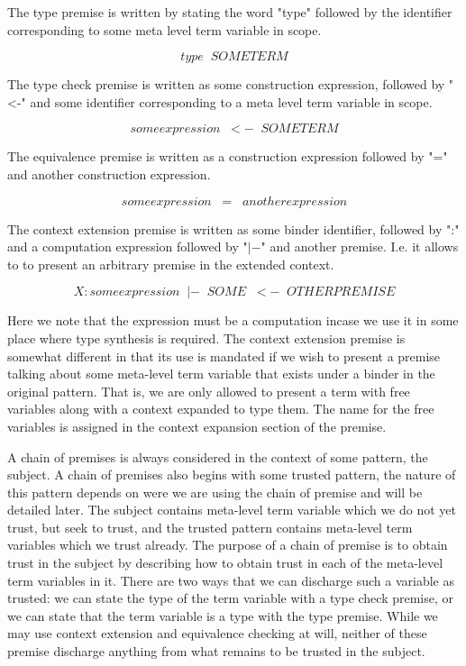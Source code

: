 The type premise is written by stating the word "type" followed by
the identifier corresponding to some meta level term variable in
scope.

$$
type \;\; SOMETERM
$$

The type check premise is written as some construction expression,
followed by "\textless -" and some identifier corresponding to a meta
level term variable in scope.

$$
someexpression \;\;<-\;\; SOMETERM
$$

The equivalence premise is written as a construction expression
followed by "=" and another construction expression.

$$
someexpression \;\;=\;\; anotherexpression
$$

The context extension premise is written as some binder identifier,
followed by ":" and a computation expression followed by "$|-$" and
another premise. I.e. it allows to to present an arbitrary premise in
the extended context.

$$
X : someexpression \;\;|-\;\; SOME \;\;<-\;\; OTHERPREMISE
$$

Here we note that the expression must be a computation incase we use
it in some place where type synthesis is required. The context
extension premise is somewhat different in that its use is mandated if
we wish to present a premise talking about some meta-level term
variable that exists under a binder in the original pattern. That is,
we are only allowed to present a term with free variables along with a
context expanded to type them. The name for the free variables is
assigned in the context expansion section of the premise.

A chain of premises is always considered in the context of some
pattern, the subject. A chain of premises also begins with some
trusted pattern, the nature of this pattern depends on were we are
using the chain of premise and will be detailed later. The subject
contains meta-level term variable which we do not yet trust, but seek
to trust, and the trusted pattern contains meta-level term variables
which we trust already. The purpose of a chain of premise is to obtain
trust in the subject by describing how to obtain trust in each of the
meta-level term variables in it. There are two ways that we can
discharge such a variable as trusted: we can state the type of the
term variable with a type check premise, or we can state that the term
variable is a type with the type premise. While we may use context
extension and equivalence checking at will, neither of these premise
discharge anything from what remains to be trusted in the subject.

